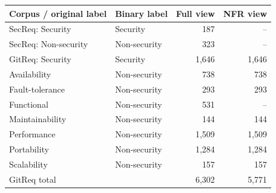 \begin{tabular}{llrr}
\toprule
Corpus / original label & Binary label & Full view & NFR view \\
\midrule
SecReq: Security & Security & 187 & -- \\
SecReq: Non-security & Non-security & 323 & -- \\
\midrule
GitReq: Security & Security & 1,646 & 1,646 \\
Availability & Non-security & 738 & 738 \\
Fault-tolerance & Non-security & 293 & 293 \\
Functional & Non-security & 531 & -- \\
Maintainability & Non-security & 144 & 144 \\
Performance & Non-security & 1,509 & 1,509 \\
Portability & Non-security & 1,284 & 1,284 \\
Scalability & Non-security & 157 & 157 \\
\midrule
GitReq total & & 6,302 & 5,771 \\
\bottomrule
\end{tabular}
